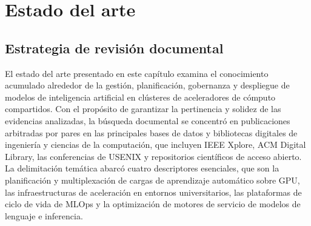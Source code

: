 %
%
\chapter{Estado del arte}\label{cha:estado-del-arte}

\section{Estrategia de revisión documental}\label{sec:estrategia-revision}

El estado del arte presentado en este capítulo examina el conocimiento acumulado alrededor de la gestión, planificación, gobernanza y despliegue de modelos de inteligencia artificial en clústeres de aceleradores de cómputo compartidos. Con el propósito de garantizar la pertinencia y solidez de las evidencias analizadas, la búsqueda documental se concentró en publicaciones arbitradas por pares en las principales bases de datos y bibliotecas digitales de ingeniería y ciencias de la computación, que incluyen IEEE Xplore, ACM Digital Library, las conferencias de USENIX y repositorios científicos de acceso abierto. La delimitación temática abarcó cuatro descriptores esenciales, que son la planificación y multiplexación de cargas de aprendizaje automático sobre GPU, las infraestructuras de aceleración en entornos universitarios, las plataformas de ciclo de vida de MLOps y la optimización de motores de servicio de modelos de lenguaje e inferencia.

